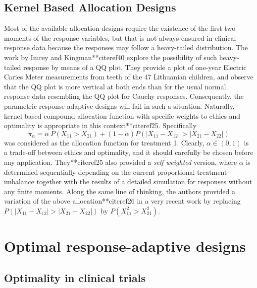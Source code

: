 \subsection{Kernel Based Allocation Designs}

Most of the available allocation designs require the existence of the first two moments of the response variables, but that is not always ensured in clinical response data because the responses may follow a heavy-tailed distribution. The work by Imrey and Kingman**citeref{40} explore the possibility of such heavy-tailed response by means of a QQ plot. They provide a plot of one-year Electric Caries Meter measurements from teeth of the 47 Lithuanian children, and observe that the QQ plot is more vertical at both  ends than for the usual normal response data resembling the QQ plot for Cauchy responses. Consequently, the parametric response-adaptive designs will fail in such a situation. Naturally, kernel based compound allocation function  with specific weights to ethics and optimality is appropriate in this context**citeref{25}. Specifically 
$$\pi_{\alpha}=\alpha ~P(X_{11}>X_{21})+(1-\alpha )P(|X_{11}-X_{12}|>|X_{21}-X_{22}|)$$
was considered as the allocation function for treatment 1. Clearly, $\alpha\in (0,1)$ is a trade-off between ethics and optimality, and it should carefully be chosen before any application. They**citeref{25} also provided a \textit{self weighted} version, where $\alpha$ is determined sequentially depending on the current proportional treatment imbalance together with the results of a detailed simulation for responses without any finite moments. Along the same line of thinking, the authors provided a variation of the above allocation**citeref{26} in a very recent work  by replacing $P(|X_{11}-X_{12}|>|X_{21}-X_{22}|)$  by $P(X^{2}_{11}>X^{2}_{21}).$

\section{Optimal response-adaptive designs}

\subsection{Optimality in clinical trials}

